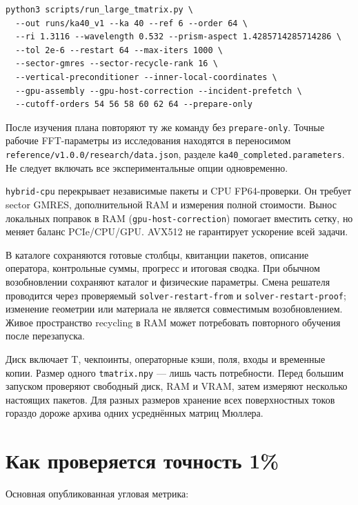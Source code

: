 \documentclass[
  russian,
  11pt,
  a4paper,
]{report}
\begin{document}
\begin{verbatim}
python3 scripts/run_large_tmatrix.py \
  --out runs/ka40_v1 --ka 40 --ref 6 --order 64 \
  --ri 1.3116 --wavelength 0.532 --prism-aspect 1.4285714285714286 \
  --tol 2e-6 --restart 64 --max-iters 1000 \
  --sector-gmres --sector-recycle-rank 16 \
  --vertical-preconditioner --inner-local-coordinates \
  --gpu-assembly --gpu-host-correction --incident-prefetch \
  --cutoff-orders 54 56 58 60 62 64 --prepare-only
\end{verbatim}

После изучения плана повторяют ту же команду без
\nolinkurl{prepare-only}. Точные рабочие FFT-параметры из исследования
находятся в переносимом \nolinkurl{reference/v1.0.0/research/data.json},
разделе \nolinkurl{ka40_completed.parameters}. Не следует включать все
экспериментальные опции одновременно.

\nolinkurl{hybrid-cpu} перекрывает независимые пакеты и CPU
FP64-проверки. Он требует sector GMRES, дополнительной RAM и измерения
полной стоимости. Вынос локальных поправок в RAM
(\nolinkurl{gpu-host-correction}) помогает вместить сетку, но меняет
баланс PCIe/CPU/GPU. AVX512 не гарантирует ускорение всей задачи.

В каталоге сохраняются готовые столбцы, квитанции пакетов, описание
оператора, контрольные суммы, прогресс и итоговая сводка. При обычном
возобновлении сохраняют каталог и физические параметры. Смена решателя
проводится через проверяемый \nolinkurl{solver-restart-from} и
\nolinkurl{solver-restart-proof}; изменение геометрии или материала не
является совместимым возобновлением. Живое пространство recycling в RAM
может потребовать повторного обучения после перезапуска.

Диск включает T, чекпоинты, операторные кэши, поля, входы и временные
копии. Размер одного \nolinkurl{tmatrix.npy} --- лишь часть потребности.
Перед большим запуском проверяют свободный диск, RAM и VRAM, затем
измеряют несколько настоящих пакетов. Для разных размеров хранение всех
поверхностных токов гораздо дороже архива одних усреднённых матриц
Мюллера.

\chapter{Как проверяется точность
1\%}\label{ux43aux430ux43a-ux43fux440ux43eux432ux435ux440ux44fux435ux442ux441ux44f-ux442ux43eux447ux43dux43eux441ux442ux44c-1}

Основная опубликованная угловая метрика:
\end{document}
